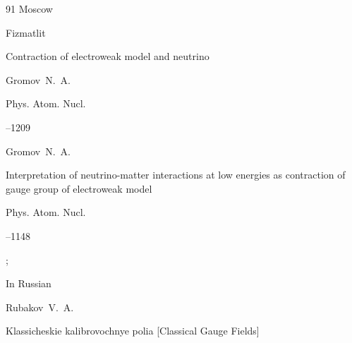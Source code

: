\begin{thebibliography}{91}
\publaddr Moscow

\publ Fizmatlit








\paper Contraction of electroweak model and neutrino

\by Gromov~N.~A.

\jour Phys. Atom. Nucl.




--1209












\by Gromov~N.~A.

\paper  Interpretation of neutrino-matter interactions at low energies as contraction of gauge group of electroweak model

\jour Phys. Atom. Nucl.




--1148


;










\lang In Russian

\by  Rubakov~V.~A. 

\book  Klassicheskie kalibrovochnye polia \rm [Classical Gauge Fields]


\end{thebibliography}
